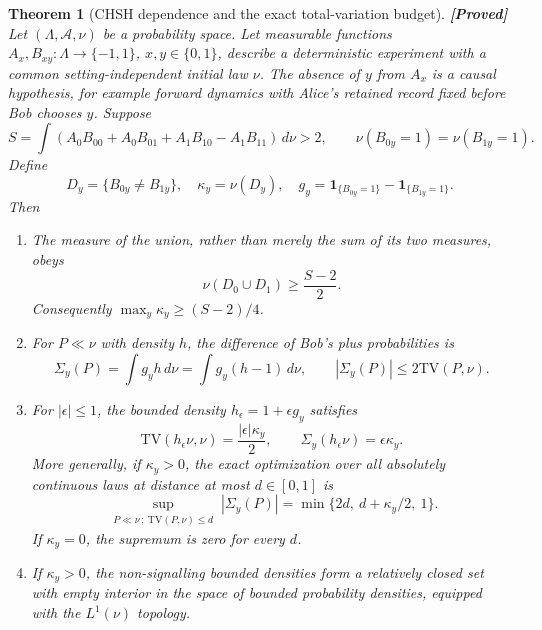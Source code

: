 \documentclass[11pt,a4paper]{article}
\newtheorem{theorem}{Theorem}[section]
\theoremstyle{definition}
\theoremstyle{remark}\newtheorem{remark}[theorem]{Remark}
\newcommand{\status}[1]{\textbf{[#1]}\quad}
\newcommand{\TV}{\mathrm{TV}}
\begin{document}
\begin{theorem}[CHSH dependence and the exact total-variation budget]
\label{sig:budget}
\status{Proved}
Let $(\Lambda,\mathcal A,\nu)$ be a probability space. Let measurable
functions $A_x,B_{xy}:\Lambda\to\{-1,1\}$, $x,y\in\{0,1\}$, describe a
deterministic experiment with a common setting-independent initial law
$\nu$. The absence of $y$ from $A_x$ is a causal hypothesis, for example
forward dynamics with Alice's retained record fixed before Bob chooses
$y$. Suppose
\[
 S=\int(A_0B_{00}+A_0B_{01}+A_1B_{10}-A_1B_{11})\,d\nu>2,
 \qquad \nu(B_{0y}=1)=\nu(B_{1y}=1).
\]
Define
\[
 D_y=\{B_{0y}\ne B_{1y}\},\quad \kappa_y=\nu(D_y),\quad
 g_y=\mathbf1_{\{B_{0y}=1\}}-\mathbf1_{\{B_{1y}=1\}}.
\]
Then
\begin{enumerate}[label=(\roman*)]
\item The measure of the union, rather than merely the sum of its two
measures, obeys
\begin{equation}\label{sig:union}
 \nu(D_0\cup D_1)\ge\frac{S-2}{2}.
\end{equation}
Consequently $\max_y\kappa_y\ge(S-2)/4$.
\item For $P\ll\nu$ with density $h$, the difference of Bob's plus
probabilities is
\begin{equation}\label{sig:signal}
 \Sigma_y(P)=\int g_yh\,d\nu=\int g_y(h-1)\,d\nu,
 \qquad |\Sigma_y(P)|\le2\TV(P,\nu).
\end{equation}
\item For $|\epsilon|\le1$, the bounded density
$h_\epsilon=1+\epsilon g_y$ satisfies
\[
 \TV(h_\epsilon\nu,\nu)=\frac{|\epsilon|\kappa_y}{2},\qquad
 \Sigma_y(h_\epsilon\nu)=\epsilon\kappa_y.
\]
More generally, if $\kappa_y>0$, the exact optimization over all
absolutely continuous laws at distance at most $d\in[0,1]$ is
\begin{equation}\label{sig:envelope}
 \sup_{\substack{P\ll\nu\,;\ \TV(P,\nu)\le d}}
 |\Sigma_y(P)|
 =\min\{2d,\ d+\kappa_y/2,\ 1\}.
\end{equation}
If $\kappa_y=0$, the supremum is zero for every $d$.
\item If $\kappa_y>0$, the non-signalling bounded densities form a
relatively closed set with empty interior in the space of bounded
probability densities, equipped with the $L^1(\nu)$ topology.
\end{enumerate}
\end{theorem}
\end{document}
